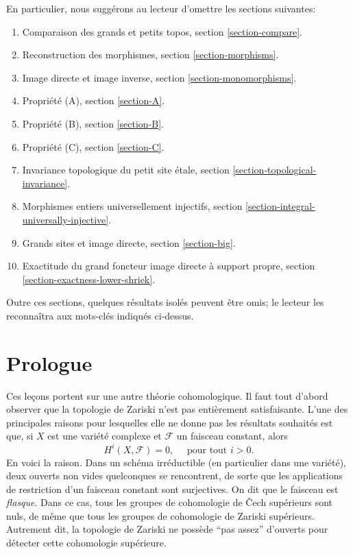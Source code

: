 \medskip\noindent
En particulier, nous sugg\'erons au lecteur d'omettre les sections suivantes:
\begin{enumerate}
\item Comparaison des grands et petits topos,
section \ref{section-compare}.
\item Reconstruction des morphismes,
section \ref{section-morphisms}.
\item Image directe et image inverse,
section \ref{section-monomorphisms}.
\item Propri\'et\'e (A),
section \ref{section-A}.
\item Propri\'et\'e (B),
section \ref{section-B}.
\item Propri\'et\'e (C),
section \ref{section-C}.
\item Invariance topologique du petit site \'etale,
section \ref{section-topological-invariance}.
\item Morphismes entiers universellement injectifs,
section \ref{section-integral-universally-injective}.
\item Grands sites et image directe,
section \ref{section-big}.
\item Exactitude du grand foncteur image directe \`a support propre,
section \ref{section-exactness-lower-shriek}.
\end{enumerate}
Outre ces sections, quelques r\'esultats isol\'es peuvent \^etre omis; le lecteur
les reconna\^itra aux mots-cl\'es indiqu\'es ci-dessus.



\section{Prologue}
\label{section-prologue}

\noindent
Ces le\c{c}ons portent sur une autre th\'eorie cohomologique. Il faut tout
d'abord observer que la topologie de Zariski n'est pas enti\`erement
satisfaisante. L'une des principales raisons pour lesquelles elle ne donne pas
les r\'esultats souhait\'es est que, si $X$ est une vari\'et\'e complexe et
$\mathcal{F}$ un faisceau constant, alors
$$
H^i(X, \mathcal{F}) = 0, \quad \text{ pour tout } i > 0.
$$
En voici la raison. Dans un sch\'ema irr\'eductible (en particulier dans une
vari\'et\'e), deux ouverts non vides quelconques se rencontrent, de sorte que les
applications de restriction d'un faisceau constant sont surjectives. On dit
que le faisceau est {\it flasque}. Dans ce cas, tous les groupes de cohomologie
de {\v C}ech sup\'erieurs sont nuls, de m\^eme que tous les groupes de
cohomologie de Zariski sup\'erieurs. Autrement dit, la topologie de Zariski ne
poss\`ede ``pas assez'' d'ouverts pour d\'etecter cette cohomologie sup\'erieure.


